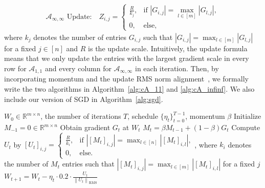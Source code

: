 \documentclass{article}
\theoremstyle{remark}
\newcommand{\Norm}[1]{\left\|#1\right\|}
\newcommand{\Abs}[1]{\left\vert #1 \right\vert}
\newcommand{\RR}{\mathbb{R}}
\newcommand{\cA}{\mathcal{A}}
\begin{document}
\begin{align*}
    \text{$\cA_{\infty,\infty}$ Update:} \quad
    Z_{i,j} = \begin{cases}
        \frac{R}{k_j}, & \text{if } \Abs{G_{i,j}} = \max_{l \in [m]} \Abs{G_{l,j}}, \\
        0, & \text{else,}
    \end{cases}
\end{align*}
where $k_j$ denotes the number of entries $G_{i,j}$ such that $\Abs{G_{i,j}} = \max_{l \in [m]} \Abs{G_{l,j}}$ for a fixed $j \in [n]$ and $R$ is the update scale. 
Intuitively, the update formula means that we only update the entries with the largest gradient scale in every row for $\cA_{1,1}$ and every column for $\cA_{\infty,\infty}$ in each iteration. 
Then, by incorporating momentum and the update RMS norm alignment~\citep{liu2025muon}, we formally write the two algorithms in Algorithm~\ref{alg:cA_11} and \ref{alg:cA_infinf}. We also include our version of SGD in Algorithm~\ref{alg:sgd}.

\begin{algorithm}[ht]
   \caption{Row Max Descent ($\cA_{1,1}$)}
   \label{alg:cA_11}
\begin{algorithmic}[1]
    $W_0\in \RR^{m\times n}$, the number of iterations $T$, schedule $\{\eta_t\}_{t=0}^{T-1}$, momentum $\beta$
   \STATE Initialize $M_{-1}=0 \in \RR^{m\times n}$
   \STATE Obtain gradient $G_t$ at $W_t$
   \STATE $M_t = \beta M_{t-1} + (1 - \beta) G_t$
   \STATE Compute $U_t$ by $[U_t]_{i,j} = \begin{cases}
        \frac{R}{k_i}, & \text{if } \Abs{[M_t]_{i,j}} = \max_{l \in [n]} \Abs{[M_t]_{i,l}}, \\
        0, & \text{else.} \end{cases}$, where $k_i$ denotes the number of $M_t$ entries such that $\Abs{[M_t]_{i,j}} = \max_{l \in [m]} \Abs{[M_t]_{i,l}}$ for a fixed $j$
   \STATE
   $W_{t+1} = W_t - \eta_t \cdot 0.2 \cdot \frac{U_t}{\Norm{U_t}_{\mathrm{RMS}}}$
   \ENDFOR
\end{algorithmic}
\end{algorithm}
\end{document}

